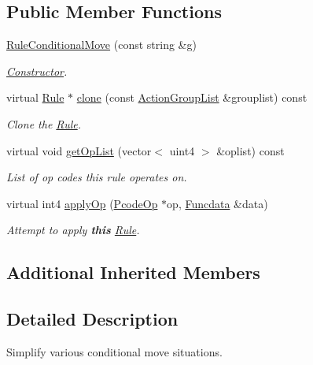 \subsection*{Public Member Functions}
\begin{DoxyCompactItemize}
\item 
\mbox{\hyperlink{class_rule_conditional_move_aa2aa312620374a34b57c723c82aec169}{Rule\+Conditional\+Move}} (const string \&g)
\begin{DoxyCompactList}\small\item\em \mbox{\hyperlink{class_constructor}{Constructor}}. \end{DoxyCompactList}\item 
virtual \mbox{\hyperlink{class_rule}{Rule}} $\ast$ \mbox{\hyperlink{class_rule_conditional_move_a708caed50cbe0b065ed64b15100cfad2}{clone}} (const \mbox{\hyperlink{class_action_group_list}{Action\+Group\+List}} \&grouplist) const
\begin{DoxyCompactList}\small\item\em Clone the \mbox{\hyperlink{class_rule}{Rule}}. \end{DoxyCompactList}\item 
virtual void \mbox{\hyperlink{class_rule_conditional_move_aea21a4a8a9848b3cfa3524eec1a416eb}{get\+Op\+List}} (vector$<$ uint4 $>$ \&oplist) const
\begin{DoxyCompactList}\small\item\em List of op codes this rule operates on. \end{DoxyCompactList}\item 
virtual int4 \mbox{\hyperlink{class_rule_conditional_move_a6f63597a783571c793f91a046166845b}{apply\+Op}} (\mbox{\hyperlink{class_pcode_op}{Pcode\+Op}} $\ast$op, \mbox{\hyperlink{class_funcdata}{Funcdata}} \&data)
\begin{DoxyCompactList}\small\item\em Attempt to apply {\bfseries{this}} \mbox{\hyperlink{class_rule}{Rule}}. \end{DoxyCompactList}\end{DoxyCompactItemize}
\subsection*{Additional Inherited Members}


\subsection{Detailed Description}
Simplify various conditional move situations. 

